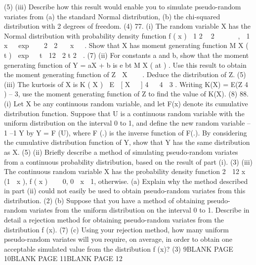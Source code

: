 (5)
(iii) Describe how this result would enable you to simulate pseudo-random variates
from
(a) the standard Normal distribution,
(b) the chi-squared distribution with 2 degrees of freedom.
(4)
77.
(i)
The random variable X has the Normal distribution with probability density
function
f ( x ) 
1
2  2
     ,
 1 x  
exp  
 2 
2
  x   .
Show that X has moment generating function
M X ( t )  exp   t  12  2 t 2  .
(7)
(ii)
For constants a and b, show that the moment generating function of Y = aX + b
is e bt M X ( at ) . Use this result to obtain the moment generating function of
Z 
X  

.
Deduce the distribution of Z.
(5)
(iii)
The kurtosis of X is
K ( X ) 
E  [ X   ] 4 
 4
 3 .
Writing K(X) = E(Z 4 ) – 3, use the moment generating function of Z to find the
value of K(X).
(8)
88.
(i) Let X be any continuous random variable, and let F(x) denote its cumulative
distribution function. Suppose that U is a continuous random variable with the
uniform distribution on the interval 0 to 1, and define the new random variable
–1
–1
Y by Y = F (U), where F (.) is the inverse function of F(.). By considering
the cumulative distribution function of Y, show that Y has the same distribution
as X.
(5)
(ii) Briefly describe a method of simulating pseudo-random variates from a
continuous probability distribution, based on the result of part (i).
(3)
(iii) The continuous random variable X has the probability density function
2
 12 x (1  x ),
f ( x )  
 0,
0  x  1,
otherwise.
(a) Explain why the method described in part (ii) could not easily be used
to obtain pseudo-random variates from this distribution.
(2)
(b) Suppose that you have a method of obtaining pseudo-random variates
from the uniform distribution on the interval 0 to 1. Describe in detail a
rejection method for obtaining pseudo-random variates from the
distribution f (x).
(7)
(c) Using your rejection method, how many uniform pseudo-random
variates will you require, on average, in order to obtain one acceptable
simulated value from the distribution f (x)?
(3)
9BLANK PAGE
10BLANK PAGE
11BLANK PAGE
12
